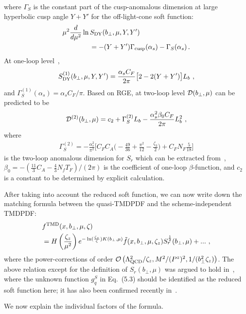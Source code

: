 \documentclass[aps,rmp,reprint,amsmath,amssymb,graphicx,longbibliography]{revtex4-1} %
\newcommand{\nn}{\nonumber}
\begin{document}
where $\Gamma_S$ is the constant part of the cusp-anomalous dimension at large hyperbolic cusp angle $Y+Y'$ for the off-light-cone soft function:
\begin{align}
	&\mu^2 \frac{d}{d\mu^2} \ln S_{\rm DY}(b_\perp,\mu,Y,Y')\nonumber \\
	&\qquad\qquad=-(Y+Y')\Gamma_{\rm cusp}(\alpha_s)-\Gamma_S(\alpha_s)\,.
\end{align}
At one-loop level~\cite{Ebert:2019okf},
\begin{align}
	S^{(1)}_{\rm DY}(b_\perp,\mu,Y,Y')=\frac{\alpha_sC_F}{2\pi}\big[2-2(Y+Y')\big]L_b \ ,
\end{align}
and $\Gamma_S^{(1)} (\alpha_s)= \alpha_s C_F/\pi$.
Based on RGE, at two-loop level ${\cal D}(b_\perp,\mu)$ can be predicted to be
\begin{align}
	{\cal D}^{(2)}(b_\perp,\mu)=c_2+\Gamma_S^{(2)}L_b-\frac{\alpha_s^2\beta_0C_F}{2\pi}L_b^2 \ ,
\end{align}
where
\begin{align}
	\Gamma_S^{(2)}=-\frac{\alpha_s^2}{\pi^2}\Big[C_FC_A\big(-\frac{49}{36}+\frac{\pi^2}{12}-\frac{\zeta_3}{2}\big)+C_FN_F\frac{5}{18}\Big]\nn
\end{align}
is the two-loop anomalous dimension for $S_r$ which can be extracted from~\cite{Grozin:2015kna}, $\beta_0=-\left(\frac{11}{3}C_A-\frac{4}{3}N_f T_F\right)/(2\pi)$ is the coefficient of one-loop $\beta$-function, and $c_2$ is a constant to be determined by explicit calculation.

After taking into account the reduced soft function, we can now write down
the matching formula between the quasi-TMDPDF and the scheme-independent TMDPDF\cite{Ji:2019ewn}:
\begin{align}\label{eq:quasiTMDmatch}
	&f^{\rm TMD}(x,b_\perp,\mu,\zeta)\\
	&=H\left(\frac{\zeta_z}{\mu^2}\right) e^{-\ln (\frac{\zeta_z}{\zeta})K(b_\perp,\mu)}\tilde f(x,b_\perp,\mu,\zeta_z)S_r^{\frac{1}{2}}(b_\perp,\mu)+...\ ,\nn
\end{align}
where the power-corrections of order ${\cal O}\left(\Lambda_{\rm QCD}^2/\zeta_z,M^2/(P^z)^2,1/(b^2_\perp\zeta_z) \right)$.
The above relation except for the definition of $S_r(b_\perp,\mu)$ was argued to hold in~\cite{Ebert:2019okf}, where the unknown function $g_q^S$ in Eq.~(5.3) should be identified as the reduced soft function here; it has also been confirmed recently in~\cite{Vladimirov:2020ofp}.


We now explain the individual factors of the formula.
\end{document}
